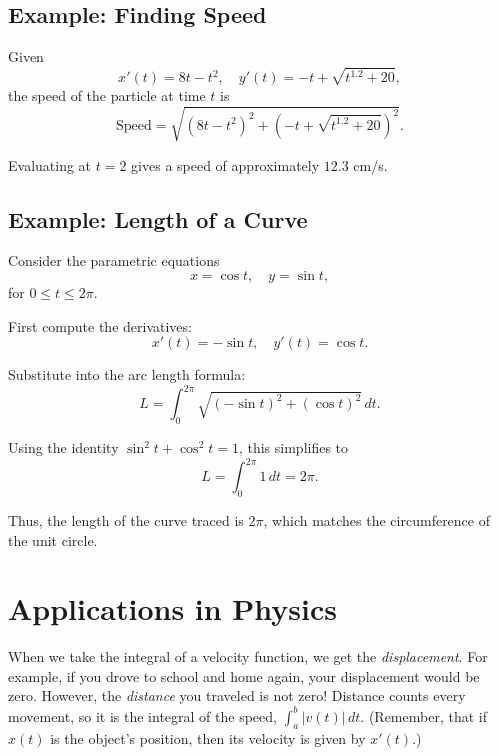 \subsection*{Example: Finding Speed}

Given
\begin{equation*}
    x'(t) = 8t - t^2, \quad y'(t) = -t + \sqrt{t^{1.2} + 20},
\end{equation*}
the speed of the particle at time $t$ is
\begin{equation*}
    \text{Speed} =
    \sqrt{(8t - t^2)^2 + \left(-t + \sqrt{t^{1.2} + 20}\right)^2}.
\end{equation*}

Evaluating at $t = 2$ gives a speed of approximately $12.3$ cm/s.

\subsection*{Example: Length of a Curve}

Consider the parametric equations
\begin{equation*}
    x = \cos t, \quad y = \sin t,
\end{equation*}
for $0 \le t \le 2\pi$.

First compute the derivatives:
\begin{equation*}
    x'(t) = -\sin t, \quad y'(t) = \cos t.
\end{equation*}

Substitute into the arc length formula:
\begin{equation*}
    L = \int_0^{2\pi} \sqrt{(-\sin t)^2 + (\cos t)^2}\, dt.
\end{equation*}

Using the identity $\sin^2 t + \cos^2 t = 1$, this simplifies to
\begin{equation*}
    L = \int_0^{2\pi} 1 \, dt = 2\pi.
\end{equation*}

Thus, the length of the curve traced is $2\pi$, which matches the circumference
of the unit circle.

\section{Applications in Physics}
When we take the integral of a velocity function, we get the 
\textit{displacement}. For example, if you drove to school and home 
again, your displacement would be zero. However, the \textit{distance} 
you traveled is not zero! Distance counts every movement, so it is the integral of the speed, $\int_a^b |v(t)|\,dt$. (Remember, that if $x(t)$ is the object's 
position, then its velocity is given by $x'(t)$.)

